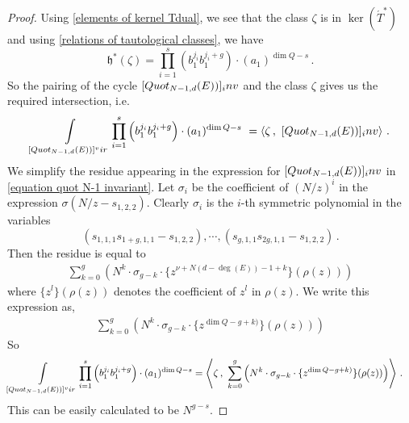 \documentclass[10pt,a4paper]{amsart}
\newcommand{\inv}[0]{\textnormal{inv}}
\newcommand{\mf}[1]{\mathfrak{#1}}
\newcommand{\quot}[0]{\textnormal{Quot}}
\newcommand{\vir}[0]{\textnormal{vir}}
\begin{document}
\begin{proof}
    Using \eqref{elements of kernel Tdual}, we see that the class
    $\zeta$ is in $\ker(\acute{T}^*)$
    and using \eqref{relations of tautological classes},
    we have 
    $$\mf h^*(\zeta) = \prod_{i=1}^s \left(b_1^{j_i}b_1^{j_i+g}\right) \cdot 
        (a_1)^{\dim Q-s}\,.$$
    So the pairing of the cycle $[\quot_{N-1,d}(E))]_\inv$ and the class $\zeta$ gives us the required intersection, i.e.
    \begin{align*}
        \int\limits_{[\quot_{N-1,d}(E))]^\vir} 
        \prod_{i=1}^s  \left(b_1^{j_i}  b_1^{j_i+g}\right) \cdot (a_1)^{\dim Q-s} \
        = \left\langle  \zeta \,, \ [\quot_{N-1,d}(E))]_\inv \right\rangle\,.
    \end{align*} 
We simplify the residue appearing in the expression for 
$[\quot_{N-1,d}(E))]_\inv$ in
\eqref{equation quot N-1 invariant}. 
Let $\sigma_i$ be the coefficient of $(N/z)^i$ 
in the expression $\sigma(N/z-s_{1,2,2})$.
Clearly $\sigma_i$ is the
$i$-th symmetric polynomial in the variables
$$(s_{1,1,1}s_{1+g,1,1}-s_{1,2,2}), \cdots, (s_{g,1,1}s_{2g,1,1}-s_{1,2,2})\,.$$
Then the residue is equal to
\begin{align*}
    \sum_{k=0}^g \left( N^k \cdot \sigma_{g-k} \cdot \{z^{\nu+N(d-\deg(E))-1+k}\}(\rho(z)) \right)
\end{align*}
where $\{z^l\}(\rho(z))$ denotes the coefficient of $z^l$ in $\rho(z)$.
We write this expression as,
\begin{align*}
    \sum_{k=0}^g \left( N^k \cdot \sigma_{g-k} \cdot \{z^{\dim Q-g+k)}\}(\rho(z)) \right)
\end{align*}
So 
\begin{align*}
        \int\limits_{[\quot_{N-1,d}(E))]^\vir} 
        \prod_{i=1}^s & \left(b_1^{j_i}  b_1^{j_i+g}\right) \cdot (a_1)^{\dim Q-s}
         = \left\langle  \zeta \,, \ \sum_{k=0}^g \left( N^k \cdot \sigma_{g-k} \cdot \{z^{\dim Q-g+k)}\}(\rho(z)) \right) \right\rangle \,.
    \end{align*} 
This can be easily calculated to be $N^{g-s}$.
\end{proof}
\end{document}
